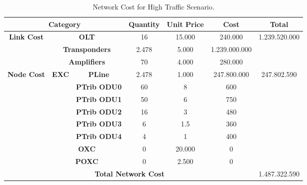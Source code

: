 \begin{table}[H]
\centering
\label{opaque_high_traffic_protec}
\begin{tabular}{|c|c|c|c|c|c|c|}
\hline
\multicolumn{3}{|c|}{\textbf{Category}}                                                   & \textbf{Quantity} & \textbf{Unit Price} & \textbf{Cost} & \textbf{Total}                 \\ \hline
\multirow{3}{*}{\textbf{Link Cost}} & \multicolumn{2}{c|}{\textbf{OLT}}                   & 16                & 15.000              & 240.000       & \multirow{3}{*}{1.239.520.000} \\ \cline{2-6}
                                    & \multicolumn{2}{c|}{\textbf{Transponders}}          & 2.478             & 5.000               & 1.239.000.000 &                                \\ \cline{2-6}
                                    & \multicolumn{2}{c|}{\textbf{Amplifiers}}            & 70                & 4.000               & 280.000       &                                \\ \hline
\multirow{8}{*}{\textbf{Node Cost}} & \multirow{6}{*}{\textbf{EXC}} & \textbf{PLine}      & 2.478             & 1.000               & 247.800.000   & \multirow{8}{*}{247.802.590}   \\ \cline{3-6}
                                    &                               & \textbf{PTrib ODU0} & 60                & 8                   & 600           &                                \\ \cline{3-6}
                                    &                               & \textbf{PTrib ODU1} & 50                & 6                   & 750           &                                \\ \cline{3-6}
                                    &                               & \textbf{PTrib ODU2} & 16                & 3                   & 480           &                                \\ \cline{3-6}
                                    &                               & \textbf{PTrib ODU3} & 6                 & 1.5                 & 360           &                                \\ \cline{3-6}
                                    &                               & \textbf{PTrib ODU4} & 4                 & 1                   & 400           &                                \\ \cline{2-6}
                                    & \multicolumn{2}{c|}{\textbf{OXC}}                   & 0                 & 20.000              & 0             &                                \\ \cline{2-6}
                                    & \multicolumn{2}{c|}{\textbf{POXC}}                  & 0                 & 2.500               & 0             &                                \\ \hline
\multicolumn{6}{|c|}{\textbf{Total Network Cost}}                                                                                                   & 1.487.322.590                  \\ \hline
\end{tabular}
\caption{Network Cost for High Traffic Scenario.}
\end{table}
